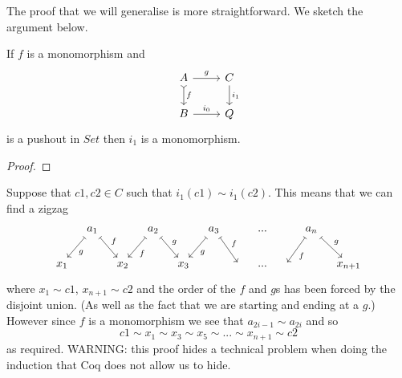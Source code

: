 \documentclass{article}
\begin{document}
The proof that we will generalise is more straightforward.
We sketch the argument below.

\begin{lemma}\label{lem:pushout-of-mono-2}
  If $f$ is a monomorphism and
  \begin{equation*}
    \begin{tikzcd}
     A \rar{g} \dar[rightarrowtail]{f} & C\dar{i_1}\\
     B \rar{i_0} & Q
    \end{tikzcd}
  \end{equation*}
  is a pushout in $Set$ then $i_1$ is a monomorphism.
  \begin{proof}

  \end{proof}
  Suppose that $c1,c2\in C$ such that $i_1(c1)\sim i_1(c2)$.
  This means that we can find a zigzag
  \begin{equation*}
    \begin{tikzcd}[column sep=0.3cm]
      {} & a_1 \dlar[mapsto]{g} \drar[mapsto]{f} & {} & a_2 \dlar[mapsto]{f} \drar[mapsto]{g}& {} & a_3 \dlar[mapsto]{g}\drar[mapsto]{f} &{} &...& & a_n \dlar[mapsto]{f}\drar[mapsto]{g} &{} \\
      x_1 & {} & x_2 & {} & x_3 & {} & {} & ...& {}  & {} & x_{n+1}
    \end{tikzcd}
  \end{equation*}
  where $x_1\sim c1$, $x_{n+1}\sim c2$ and the order of the $f$ and $g$s has been forced by the disjoint union.
  (As well as the fact that we are starting and ending at a $g$.)
  However since $f$ is a monomorphism we see that $a_{2i-1}\sim a_{2i}$ and so
  \begin{equation*}
    c1 \sim x_1 \sim x_3 \sim x_5 \sim ... \sim x_{n+1}\sim c2
  \end{equation*}
  as required.
  WARNING: this proof hides a technical problem when doing the induction that Coq does not allow us to hide.
\end{lemma}


\end{document}
